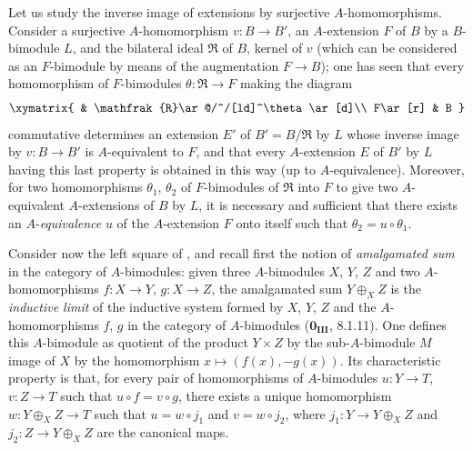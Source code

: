 \begin{env}[18.2.6]
\label{0.18.2.6}
Let us study the inverse image of extensions by surjective $A$-homomorphisms.
Consider a surjective $A$-homomorphism $v:B\to B'$, an $A$-extension $F$ of $B$ by a $B$-bimodule $L$, and the bilateral ideal $\mathfrak{R}$ of $B$, kernel of $v$ (which can be considered as an $F$-bimodule by means of the augmentation $F\to B$); one has seen  that every homomorphism of $F$-bimodules $\theta:\mathfrak{R}\to F$ making the diagram
\[
  \xymatrix{
    & \mathfrak{R}\ar@/^/[ld]^\theta\ar[d]\\
    F\ar[r] & B
  }
\]
commutative determines an extension $E'$ of $B'=B/\mathfrak{R}$ by $L$ whose inverse image by $v:B\to B'$ is $A$-equivalent to $F$, and that every $A$-extension $E$ of $B'$ by $L$ having this last property is obtained in this way (up to $A$-equivalence).
Moreover, for two homomorphisms $\theta_1$, $\theta_2$ of $F$-bimodules of $\mathfrak{R}$ into $F$ to give two $A$-equivalent $A$-extensions of $B$ by $L$, it is necessary and sufficient that there exists an $A$-\emph{equivalence} $u$ of the $A$-extension $F$ onto itself such that $\theta_2=u\circ\theta_1$.
\end{env}

\begin{env}[18.2.7]
\label{0.18.2.7}
Consider now the left square of , and recall first the notion of \emph{amalgamated sum} in the category of $A$-bimodules: given three $A$-bimodules $X$, $Y$, $Z$ and two $A$-homomorphisms $f:X\to Y$, $g:X\to Z$, the amalgamated sum $Y\oplus_X Z$ is the \emph{inductive limit} of the inductive system formed by $X$, $Y$, $Z$ and the $A$-homomorphisms $f$, $g$ in the category of $A$-bimodules ($\mathbf{0_{III}}$, 8.1.11).
One defines this $A$-bimodule as quotient of the product $Y\times Z$ by the sub-$A$-bimodule $M$ image of $X$ by the homomorphism $x\mapsto(f(x),-g(x))$.
Its characteristic property is that, for every pair of homomorphisms of $A$-bimodules $u:Y\to T$, $v:Z\to T$ such that $u\circ f=v\circ g$, there exists a unique homomorphism $w:Y\oplus_X Z\to T$ such that $u=w\circ j_1$ and $v=w\circ j_2$, where $j_1:Y\to Y\oplus_X Z$ and $j_2:Z\to Y\oplus_X Z$ are the canonical maps.
\end{env}

